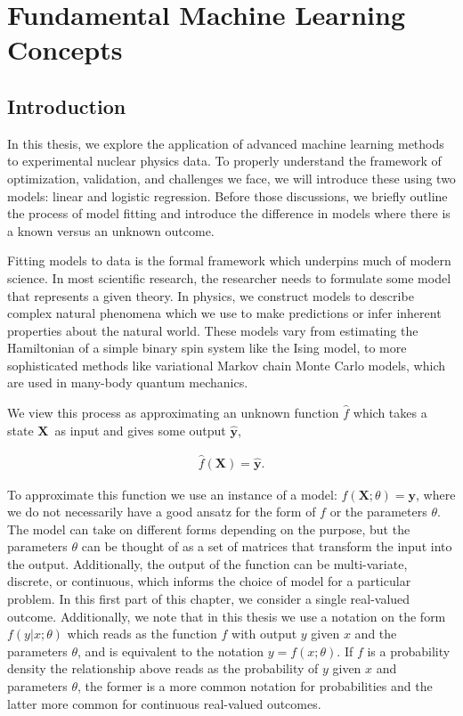 \chapter{Fundamental Machine Learning Concepts}\label{chap:fundament}
\section{Introduction}\label{sec:fundament_intro}

In this thesis, we explore the application of advanced machine learning methods to experimental nuclear physics data. To properly understand the framework of optimization, validation, and challenges we face, we will introduce these using two models: linear and logistic regression. Before those discussions, we briefly outline the process of model fitting and introduce the difference in models where there is a known versus an unknown outcome.

Fitting models to data is the formal framework which underpins much of modern science. In most scientific research, the researcher needs to formulate some model that represents a given theory. In physics, we construct models to describe complex natural phenomena which we use to make predictions or infer inherent properties about the natural world. These models vary from estimating the Hamiltonian of a simple binary spin system like the Ising model, to more sophisticated methods like variational Markov chain Monte Carlo models, which are used in many-body quantum mechanics.

We view this process as approximating an unknown function $\hat{f}$ which takes a state $\mathbf{X}$ as input and gives some output $\mathbf{\hat{y}}$,  
 
 \begin{align}
 \hat{f}(\mathbf{X}) = \mathbf{\hat{y}}.
 \end{align}

\noindent To approximate this function we use an instance of a model: $f(\mathbf{X}; \theta) = \mathbf{y}$, where we do not necessarily have a good ansatz for the form of $f$ or the parameters $\theta$. The model can take on different forms depending on the purpose, but the parameters $\theta$ can be thought of as a set of matrices that transform the input into the output. Additionally, the output of the function can be multi-variate, discrete, or continuous, which informs the choice of model for a particular problem. In this first part of this chapter, we consider a single real-valued outcome. Additionally, we note  that in this thesis we use a notation on the form $f(y | x; \theta )$ which reads as the function $f$ with output $y$ given $x$ and the parameters $\theta$, and is equivalent to the notation $y = f(x; \theta)$. If $f$ is a probability density the relationship above reads as the probability of $y$ given $x$ and parameters $\theta$, the former is a more common notation for probabilities and the latter more common for continuous real-valued outcomes. 

